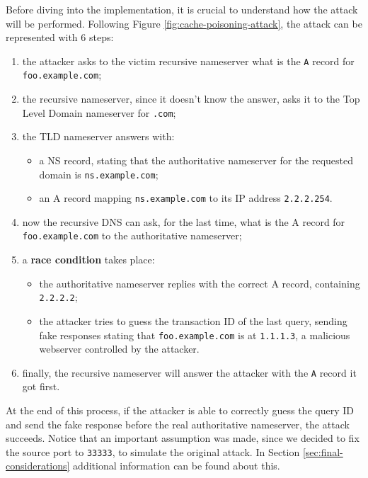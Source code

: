 \documentclass[11pt,a4paper]{article}
\begin{document}
\noindent
Before diving into the implementation, it is crucial to understand how the attack will be performed. Following Figure \ref{fig:cache-poisoning-attack}, the attack can be represented with 6 steps:
\begin{enumerate}
    \item the attacker asks to the victim recursive nameserver what is the \texttt{A} record for\\\texttt{foo.example.com};
    \item the recursive nameserver, since it doesn't know the answer, asks it to the Top Level Domain nameserver for \texttt{.com};
    \item the TLD nameserver answers with: 
    \begin{itemize}
        \item a NS record, stating that the authoritative nameserver for the requested domain is \texttt{ns.example.com};
        \item an A record mapping \texttt{ns.example.com} to its IP address \texttt{2.2.2.254}.
    \end{itemize}
    \item now the recursive DNS can ask, for the last time, what is the A record for \texttt{foo.example.com} to the authoritative nameserver;
    \item a \textbf{race condition} takes place:
    \begin{itemize}
        \item the authoritative nameserver replies with the correct A record, containing \texttt{2.2.2.2};
        \item the attacker tries to guess the transaction ID of the last query, sending fake responses stating that \texttt{foo.example.com} is at \texttt{1.1.1.3}, a malicious webserver controlled by the attacker.
    \end{itemize}
    \item finally, the recursive nameserver will answer the attacker with the \texttt{A} record it got first.
\end{enumerate}

\noindent
At the end of this process, if the attacker is able to correctly guess the query ID and send the fake response before the real authoritative nameserver, the attack succeeds. Notice that an important assumption was made, since we decided to fix the source port to \texttt{33333}, to simulate the original attack. In Section \ref{sec:final-considerations} additional information can be found about this.
\end{document}
